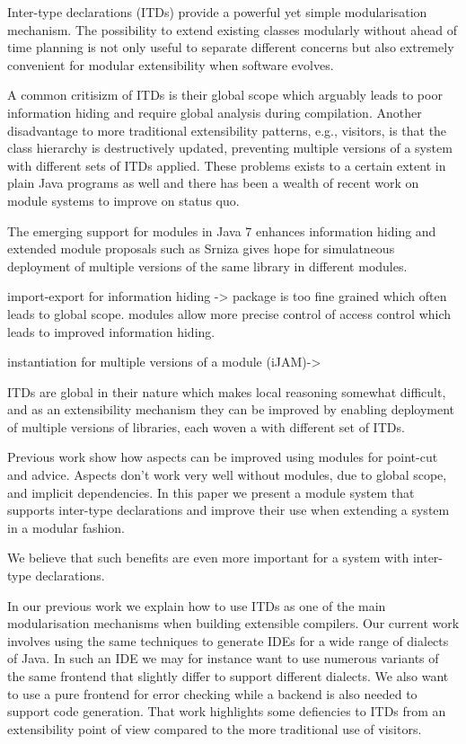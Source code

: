 
Inter-type declarations (ITDs) provide a powerful yet simple modularisation
mechanism. The possibility to extend existing classes modularly without
ahead of time planning is not only useful to separate different concerns
but also extremely convenient for modular extensibility when software
evolves.

A common critisizm of ITDs is their global scope which arguably leads to
poor information hiding and require global analysis during compilation.
Another disadvantage to more traditional extensibility patterns, e.g.,
visitors, is that the class hierarchy is destructively updated, preventing
multiple versions of a system with different sets of ITDs applied.
These problems exists to a certain extent in plain Java programs as well
and there has been a wealth of recent work on module systems to improve on
status quo. 

The emerging support for modules in Java 7 enhances information hiding and
extended module proposals such as Srniza gives hope for simulatneous
deployment of multiple versions of the same library in different modules.

import-export for information hiding -> package is too fine grained which
often leads to global scope. modules allow more precise control of
access control which leads to improved information hiding.

instantiation for multiple versions of a module (iJAM)-> 

ITDs are global in their nature which makes local
reasoning somewhat difficult, and as an extensibility mechanism they can be
improved by enabling deployment of multiple versions of libraries, 
each woven a with different set of ITDs.


Previous work show how aspects can be improved using modules for point-cut
and advice.
Aspects don't work very well without modules, due to global scope, and
implicit dependencies.
In this paper we present a module system that supports inter-type
declarations and improve their use when extending a system in a modular
fashion.

We believe that such benefits are even more important for a system with
inter-type declarations. 




In our previous work we explain how to use ITDs as one of the main
modularisation mechanisms when building extensible compilers. Our current
work involves using the same techniques to generate IDEs for a wide range
of dialects of Java. In such an IDE we may for instance want to use numerous variants of the
same frontend that slightly differ to support different dialects. We also
want to use a pure frontend for error checking while a backend is also
needed to support code generation.
That work highlights some defiencies to ITDs from an extensibility point of
view compared to the more traditional use of visitors.

